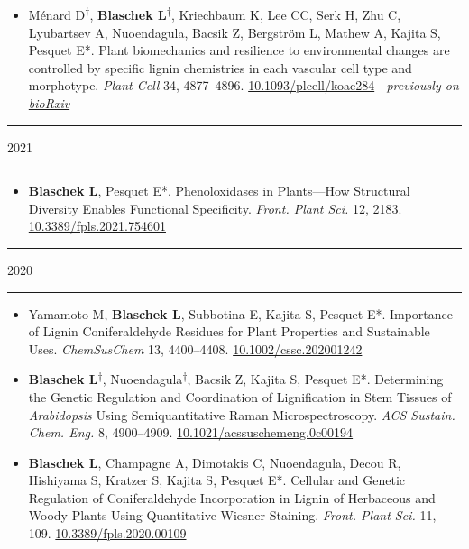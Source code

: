 \documentclass[11pt]{article}
\newcommand*{\xdash}[1][3em]{\rule[0.5ex]{#1}{0.55pt}}
\begin{document}
\vspace{-0.175cm}	
\begin{itemize}[label={},itemindent=-9pt,leftmargin=24pt]
	\itemsep-0.1cm
	\item Ménard D\textsuperscript{$\dagger$}, \textbf{Blaschek L}\textsuperscript{$\dagger$}, Kriechbaum K, Lee CC, Serk H, Zhu C, Lyubartsev A, Nuoendagula, Bacsik Z, Bergström L, Mathew A, Kajita S, Pesquet E*. Plant biomechanics and resilience to environmental changes are controlled by specific lignin chemistries in each vascular cell type and morphotype. \textit{Plant Cell} 34, 4877–4896. \href{https://doi.org/10.1093/plcell/koac284}{10.1093/plcell/koac284} \textemdash $\;$ \textit{previously on \href{https://doi.org/10.1101/2021.06.12.447240}{bioRxiv}}
\end{itemize}

\hspace*{\fill} \xdash[6em] \large{\textsc{2021}} \xdash[6em] \hspace*{\fill} \normalsize

\vspace{-0.175cm}	
\begin{itemize}[label={},itemindent=-9pt,leftmargin=24pt]
	\itemsep-0.1cm
	\item \textbf{Blaschek L}, Pesquet E*. Phenoloxidases in Plants—How Structural Diversity Enables Functional Specificity. \textit{Front. Plant Sci.} 12, 2183.
	\href{https://doi.org/10.3389/fpls.2021.754601}{10.3389/fpls.2021.754601}
\end{itemize}

\hspace*{\fill} \xdash[6em] \large{\textsc{2020}} \xdash[6em] \hspace*{\fill} \normalsize

\vspace{-0.175cm}	
\begin{itemize}[label={},itemindent=-9pt,leftmargin=24pt]
	\itemsep-0.1cm
	\item Yamamoto M, \textbf{Blaschek L}, Subbotina E, Kajita S, Pesquet E*. Importance of Lignin Coniferaldehyde Residues for Plant Properties and Sustainable Uses. \textit{ChemSusChem} 13, 4400–4408.
	\href{https://doi.org/10.1002/cssc.202001242}{10.1002/cssc.202001242}
	\item \textbf{Blaschek L}\textsuperscript{$\dagger$}, Nuoendagula\textsuperscript{$\dagger$}, Bacsik Z, Kajita S, Pesquet E*. Determining the Genetic Regulation and Coordination of Lignification in Stem Tissues of \textit{Arabidopsis} Using Semiquantitative Raman Microspectroscopy. \textit{ACS Sustain. Chem. Eng.} 8, 4900--4909. \href{https://dx.doi.org/10.1021/acssuschemeng.0c00194}{10.1021/acssuschemeng.0c00194}
	\item \textbf{Blaschek L}, Champagne A, Dimotakis C, Nuoendagula, Decou R, Hishiyama S, Kratzer S, Kajita S, Pesquet E*. Cellular and Genetic Regulation of Coniferaldehyde Incorporation in Lignin of Herbaceous and Woody Plants Using Quantitative Wiesner Staining. \textit{Front. Plant Sci.} 11, 109. \href{https://doi.org/10.3389/fpls.2020.00109}{10.3389/fpls.2020.00109}
\end{itemize}
\end{document}
